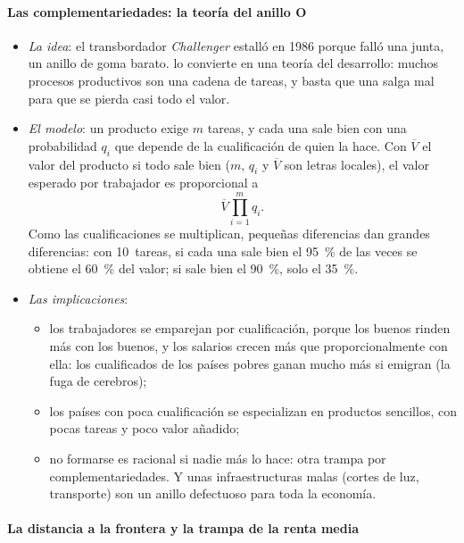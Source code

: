 \documentclass[11pt]{article}
\begin{document}
\paragraph{Las complementariedades: la teoría del anillo O}

\begin{itemize}
\item \emph{La idea}: el transbordador \emph{Challenger} estalló en 1986 porque falló una junta, un anillo de goma barato. \textcite{Kremer1993ORing} lo convierte en una teoría del desarrollo: muchos procesos productivos son una cadena de tareas, y basta que una salga mal para que se pierda casi todo el valor.
\item \emph{El modelo}: un producto exige $m$ tareas, y cada una sale bien con una probabilidad $q_i$ que depende de la cualificación de quien la hace. Con $\overline V$ el valor del producto si todo sale bien ($m$, $q_i$ y $\overline V$ son letras locales), el valor esperado por trabajador es proporcional a
  \[
  \overline V\prod_{i=1}^{m}q_i .
  \]
  Como las cualificaciones se multiplican, pequeñas diferencias dan grandes diferencias: con 10~tareas, si cada una sale bien el 95~\% de las veces se obtiene el 60~\% del valor; si sale bien el 90~\%, solo el 35~\%.
\item \emph{Las implicaciones}:
  \begin{itemize}
  \item los trabajadores se emparejan por cualificación, porque los buenos rinden más con los buenos, y los salarios crecen más que proporcionalmente con ella: los cualificados de los países pobres ganan mucho más si emigran (la fuga de cerebros);
  \item los países con poca cualificación se especializan en productos sencillos, con pocas tareas y poco valor añadido;
  \item no formarse es racional si nadie más lo hace: otra trampa por complementariedades. Y unas infraestructuras malas (cortes de luz, transporte) son un anillo defectuoso para toda la economía.
  \end{itemize}
\end{itemize}

\paragraph{La distancia a la frontera y la trampa de la renta media}
\end{document}
